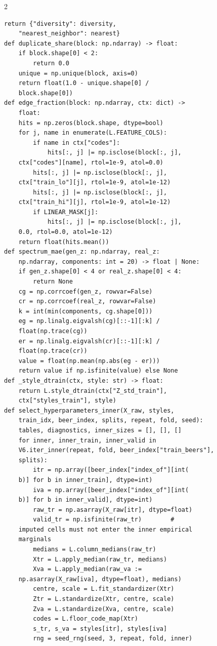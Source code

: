 \begin{multicols}{2}
\begin{Verbatim}[fontsize=\scriptsize]
    return {"diversity": diversity,
    "nearest_neighbor": nearest}
def duplicate_share(block: np.ndarray) -> float:
    if block.shape[0] < 2:
        return 0.0
    unique = np.unique(block, axis=0)
    return float(1.0 - unique.shape[0] /
    block.shape[0])
def edge_fraction(block: np.ndarray, ctx: dict) ->
    float:
    hits = np.zeros(block.shape, dtype=bool)
    for j, name in enumerate(L.FEATURE_COLS):
        if name in ctx["codes"]:
            hits[:, j] |= np.isclose(block[:, j],
    ctx["codes"][name], rtol=1e-9, atol=0.0)
        hits[:, j] |= np.isclose(block[:, j],
    ctx["train_lo"][j], rtol=1e-9, atol=1e-12)
        hits[:, j] |= np.isclose(block[:, j],
    ctx["train_hi"][j], rtol=1e-9, atol=1e-12)
        if LINEAR_MASK[j]:
            hits[:, j] |= np.isclose(block[:, j],
    0.0, rtol=0.0, atol=1e-12)
    return float(hits.mean())
def spectrum_mae(gen_z: np.ndarray, real_z:
    np.ndarray, components: int = 20) -> float | None:
    if gen_z.shape[0] < 4 or real_z.shape[0] < 4:
        return None
    cg = np.corrcoef(gen_z, rowvar=False)
    cr = np.corrcoef(real_z, rowvar=False)
    k = int(min(components, cg.shape[0]))
    eg = np.linalg.eigvalsh(cg)[::-1][:k] /
    float(np.trace(cg))
    er = np.linalg.eigvalsh(cr)[::-1][:k] /
    float(np.trace(cr))
    value = float(np.mean(np.abs(eg - er)))
    return value if np.isfinite(value) else None
def _style_dtrain(ctx, style: str) -> float:
    return L.style_dtrain(ctx["Z_std_train"],
    ctx["styles_train"], style)
def select_hyperparameters_inner(X_raw, styles,
    train_idx, beer_index, splits, repeat, fold, seed):
    tables, diagnostics, inner_sizes = [], [], []
    for inner, inner_train, inner_valid in
    V6.iter_inner(repeat, fold, beer_index["train_beers"],
    splits):
        itr = np.array([beer_index["index_of"][int(
    b)] for b in inner_train], dtype=int)
        iva = np.array([beer_index["index_of"][int(
    b)] for b in inner_valid], dtype=int)
        raw_tr = np.asarray(X_raw[itr], dtype=float)
        valid_tr = np.isfinite(raw_tr)        #
    imputed cells must not enter the inner empirical
    marginals
        medians = L.column_medians(raw_tr)
        Xtr = L.apply_median(raw_tr, medians)
        Xva = L.apply_median(raw_va :=
    np.asarray(X_raw[iva], dtype=float), medians)
        centre, scale = L.fit_standardizer(Xtr)
        Ztr = L.standardize(Xtr, centre, scale)
        Zva = L.standardize(Xva, centre, scale)
        codes = L.floor_code_map(Xtr)
        s_tr, s_va = styles[itr], styles[iva]
        rng = seed_rng(seed, 3, repeat, fold, inner)

\end{Verbatim}
\end{multicols}
